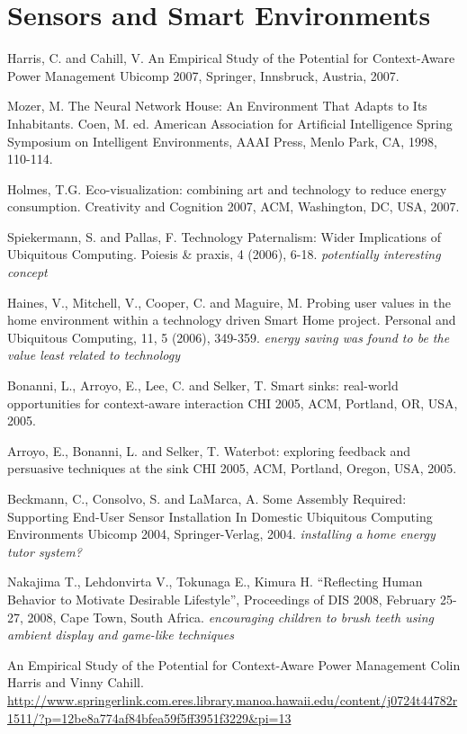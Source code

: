 \section{Sensors and Smart Environments}

Harris, C. and Cahill, V. An Empirical Study of the Potential for Context-Aware Power Management Ubicomp 2007, Springer, Innsbruck, Austria, 2007.

Mozer, M. The Neural Network House: An Environment That Adapts to Its Inhabitants. Coen, M. ed. American Association for Artificial Intelligence Spring Symposium on Intelligent Environments, AAAI Press, Menlo Park, CA, 1998, 110-114.

Holmes, T.G. Eco-visualization: combining art and technology to reduce energy consumption. Creativity and Cognition 2007, ACM, Washington, DC, USA, 2007.

Spiekermann, S. and Pallas, F. Technology Paternalism: Wider Implications of Ubiquitous Computing. Poiesis \& praxis, 4 (2006), 6-18. \emph{potentially interesting concept}

Haines, V., Mitchell, V., Cooper, C. and Maguire, M. Probing user values in the home environment within a technology driven Smart Home project. Personal and Ubiquitous Computing, 11, 5 (2006), 349-359. \emph{energy saving was found to be the value least related to technology}

Bonanni, L., Arroyo, E., Lee, C. and Selker, T. Smart sinks: real-world opportunities for context-aware interaction CHI 2005, ACM, Portland, OR, USA, 2005.

Arroyo, E., Bonanni, L. and Selker, T. Waterbot: exploring feedback and persuasive techniques at the sink CHI 2005, ACM, Portland, Oregon, USA, 2005.

Beckmann, C., Consolvo, S. and LaMarca, A. Some Assembly Required: Supporting End-User Sensor Installation In Domestic Ubiquitous Computing Environments Ubicomp 2004, Springer-Verlag, 2004. \emph{installing a home energy tutor system?}

Nakajima T., Lehdonvirta V., Tokunaga E., Kimura H. “Reﬂecting Human Behavior to Motivate Desirable Lifestyle”, Proceedings of DIS 2008, February 25-27, 2008, Cape Town, South Africa. \emph{encouraging children to brush teeth using ambient display and game-like techniques}

An Empirical Study of the Potential for Context-Aware Power Management
Colin Harris and Vinny Cahill. \url{http://www.springerlink.com.eres.library.manoa.hawaii.edu/content/j0724t44782r1511/?p=12be8a774af84bfea59f5ff3951f3229&pi=13}


